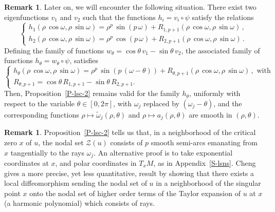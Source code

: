 \documentclass[12pt,a4paper]{amsart}
\theoremstyle{plain} %
\theoremstyle{definition}
\newtheorem{remark}[theorem]{Remark}
\numberwithin{equation}{section}
\numberwithin{figure}{section}
\numberwithin{table}{section}
\newcommand{\cZ}{\mathcal{Z}}
\newcommand{\omegat}{\widetilde{\omega}}
\begin{document}
\begin{remark}\label{R-lsc-2}
Later on, we will encounter the following situation. There exist two eigenfunctions $v_1$ and $v_2$ such that the functions $h_i = v_i \circ \psi$ satisfy the relations
%
\begin{equation}%
\left\{
\begin{array}{l}
h_1(\rho\, \cos \omega, \rho\, \sin \omega) = \rho^p \, \sin(p\,\omega) + R_{1,p+1}(\rho\, \cos \omega, \rho\, \sin \omega)\,,\\[5pt]
h_2(\rho\, \cos \omega, \rho\, \sin \omega) = \rho^p \, \cos(p\,\omega) + R_{2,p+1}(\rho\, \cos \omega, \rho\, \sin \omega)\,.
\end{array}%
\right.
\end{equation}
%
Defining the family of functions $w_{\theta} = \cos\theta \, v_1 - \sin\theta \, v_2$, the associated family of functions $h_{\theta} = w_{\theta}\circ \psi$, satisfies
%
\begin{equation}%
\left\{
\begin{array}{l}
h_{\theta}(\rho\, \cos \omega, \rho\, \sin \omega) = \rho^p \, \sin(p\,(\omega - \theta)) + R_{\theta,p+1}(\rho\, \cos \omega, \rho\, \sin \omega)\,, \text{~with}\\[5pt]
R_{\theta,p+1} = \cos\theta \, R_{1,p+1} - \sin\theta \, R_{2,p+1}.
\end{array}%
\right.
\end{equation}
%
Then, Proposition~\ref{P-lsc-2} remains valid for the family $h_{\theta}$, uniformly with respect to the variable $\theta \in [0,2\pi]$, with $\omega_j$ replaced by $(\omega_j-\theta)$, and the corresponding functions $\rho \mapsto \omegat_j(\rho,\theta)$ and $\rho \mapsto a_j(\rho,\theta)$ are smooth in $(\rho,\theta)$.
\end{remark}%


\begin{remark}\label{R-lsc-4}
Proposition~\ref{P-lsc-2} tells us that, in a neighborhood of the critical zero $x$ of $u$, the nodal set $\cZ(u)$ consists of $p$ smooth semi-arcs emanating from $x$ tangentially to the rays $\omega_j$.  An alternative proof is to take exponential coordinates at $x$, and polar coordinates in $T_xM$, as in Appendix~\ref{S-lsns}. Cheng \cite{Chen1976} gives a more precise, yet less quantitative, result by showing that there exists a local diffeomorphism sending the nodal set of $u$ in a neighborhood of the singular point $x$ onto the nodal set of higher order terms of the Taylor expansion of $u$ at $x$ (a harmonic polynomial) which consists of rays.
\end{remark}%
\end{document}
